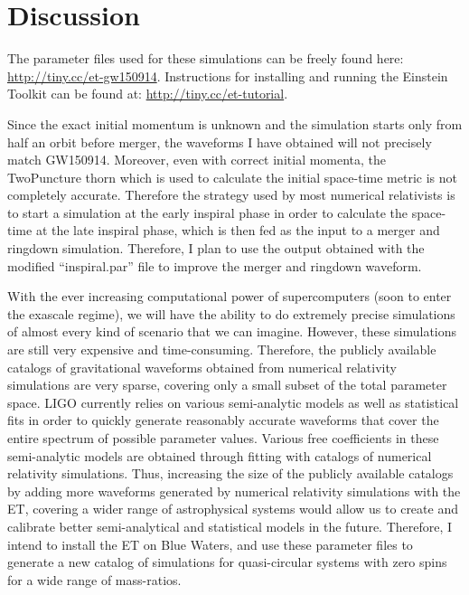 \documentclass[aps,twocolumn,secnumarabic,nobalancelastpage,amsmath,amssymb,
nofootinbib]{revtex4}
\begin{document}
	
	\section{Discussion}
	
	The parameter files used for these simulations can be freely found here: \href{http://tiny.cc/et-gw150914}{http://tiny.cc/et-gw150914}. Instructions for installing and running the Einstein Toolkit can be found at: \href{http://tiny.cc/et-tutorial}{http://tiny.cc/et-tutorial}.
	  \newline
	    
	Since the exact initial momentum is unknown and the simulation starts only from half an orbit before merger, the waveforms I have obtained will not precisely match GW150914. Moreover, even with correct initial momenta, the TwoPuncture thorn which is used to calculate the initial space-time metric is not completely accurate. Therefore the strategy used by most numerical relativists is to start a simulation at the early inspiral phase in order to calculate the space-time at the late inspiral phase, which is then fed as the input to a merger and ringdown simulation. Therefore, I plan to use the output obtained with the modified ``inspiral.par'' file to improve the merger and ringdown waveform.
	\newline
		
	With the ever increasing computational power of supercomputers (soon to enter the exascale regime), we will have the ability to do extremely precise simulations of almost every kind of scenario that we can imagine. However, these simulations are still very	expensive and time-consuming. Therefore, the publicly available catalogs of gravitational waveforms obtained from numerical relativity simulations are very sparse, covering only a small subset of the total parameter space. LIGO currently relies on various semi-analytic models as well as statistical fits in order to quickly generate reasonably accurate waveforms that cover the entire spectrum of possible parameter values. Various free coefficients in these semi-analytic models are obtained through fitting with catalogs of numerical relativity simulations. Thus, increasing the size of the publicly available catalogs by adding more waveforms generated by numerical relativity simulations with the ET, covering a wider range of astrophysical systems would allow us to create and calibrate better semi-analytical and statistical models in the future. Therefore, I intend to install the ET on Blue Waters, and use these parameter files to generate a new catalog of simulations for quasi-circular systems with zero spins for a wide range of mass-ratios.
	  \newline
	  
\end{document}
